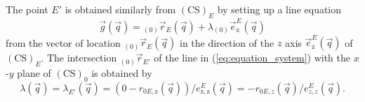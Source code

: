 \documentclass[graybox,vecphys]{svmult}
\newcommand{\bm}[1]{\boldsymbol{#1}}
\newcommand{\ks}[1]{{(\mathrm{CS})_{#1}}}
\begin{document}
The point $E'$ is obtained similarly from $\ks{E}$ by setting up a line equation %
\begin{equation}
\label{eq:equation_system}
{\vec{g}(\vec{q})}
={_{(0)}\vec{r}_E(\vec{q})}+ {\lambda{_{(0)}\vec{e}_{\mathrm{z}}^{E}}(\vec{q})}
\end{equation}
from the vector of location ${_{(0)}\vec{r}_E(\vec{q})}$
in the direction of the $z$ axis $\vec{e}_{\mathrm{z}}^{E}(\vec{q})$ %
of $\ks{E}$.
%
The intersection
${_{(0)}\vec{r}_{E'}}%
$
of the line in (\ref{eq:equation_system}) with the $x$-$y$ plane of $\ks{0}$ is obtained by
\begin{equation}
\label{eq:lambda_Edash}
{\lambda(\vec{q})} 
= 
{\lambda_{E'}(\vec{q})} 
= 
\left(0 - r_{0E,\mathrm{z}}(\vec{q})\right)/{e_\mathrm{z,z}^E}(\vec{q}) 
= 
-r_{0E,z}(\vec{q}) / e_{z,z}^E(\vec{q}).
\end{equation}
\end{document}
